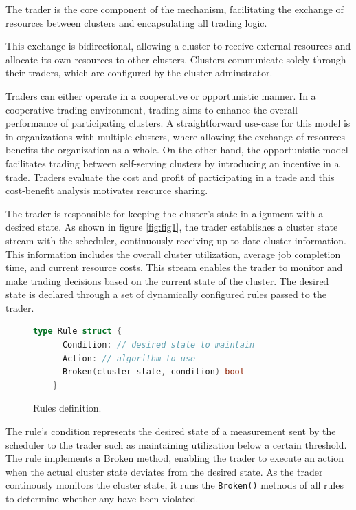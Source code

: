 The trader is the core component of the mechanism, facilitating the
exchange of resources between clusters and encapsulating all trading logic. 

This exchange is bidirectional, allowing a cluster to receive external
resources and allocate its own resources to other clusters. Clusters 
communicate solely through their traders, which are configured by the
cluster adminstrator. 

Traders can either operate in a cooperative or opportunistic manner. In a
cooperative trading environment, trading aims to enhance the overall
performance of participating clusters. A straightforward use-case for this
model is in organizations with multiple clusters, where allowing the exchange
of resources benefits the organization as a whole. On the other hand, the
opportunistic model facilitates trading between self-serving clusters by
introducing an incentive in a trade. Traders evaluate the cost and profit of
participating in a trade and this cost-benefit analysis motivates resource
sharing.

The trader is responsible for keeping the cluster's state in alignment with a
desired state. As shown in figure \ref{fig:fig1}, the trader establishes a cluster state
stream with the scheduler, continuously receiving up-to-date cluster
information. This information includes the overall cluster utilization, average
job completion time, and current resource costs. This stream enables the trader
to monitor and make trading decisions based on the current state of the
cluster. The desired state is declared through a set of dynamically
configured rules passed to the trader.

\begin{figure}[t]
  \begin{lstlisting}[language=go]
    type Rule struct {
      Condition: // desired state to maintain
      Action: // algorithm to use
      Broken(cluster state, condition) bool
    } 
  \end{lstlisting}
  \caption{Rules definition.}
\end{figure}

The rule's condition represents the desired state of a measurement sent by the
scheduler to the trader such as maintaining utilization below a certain
threshold. The rule implements a Broken method, enabling the trader to execute 
an action when the actual cluster state deviates from the desired state. As the
trader continously monitors the cluster state, it runs the \lstinline{Broken()} methods of
all rules to determine whether any have been violated.

